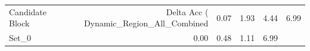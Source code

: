 \begin{tabular}{lrrrr}
\toprule
Candidate Block & Delta Acc (%
\midrule
Dynamic_Region_All_Combined & 0.07 & 1.93 & 4.44 & 6.99 \\
Set_0 & 0.00 & 0.48 & 1.11 & 6.99 \\
\bottomrule
\end{tabular}
